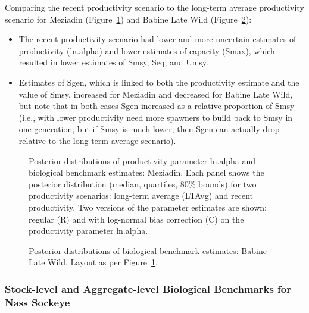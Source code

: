 \documentclass[french,11pt]{book}
\begin{document}
Comparing the recent productivity scenario to the long-term average productivity scenario for Meziadin (Figure~\ref{fig:BMMezidian}) and Babine Late Wild (Figure~\ref{fig:BMBabLW}):
\begin{itemize}

\item
  The recent productivity scenario had lower and more uncertain estimates of productivity (ln.alpha) and lower estimates of capacity (Smax), which resulted in lower estimates of Smsy, Seq, and Umsy.
\item
  Estimates of Sgen, which is linked to both the productivity estimate and the value of Smsy, increased for Meziadin and decreased for Babine Late Wild, but note that in both cases Sgen increased as a relative proportion of Smsy (i.e., with lower productivity need more spawners to build back to Smsy in one generation, but if Smsy is much lower, then Sgen can actually drop relative to the long-term average scenario).
\end{itemize}

\begin{figure}[htb]

{\centering {} 

}

\caption{Posterior distributions of productivity parameter ln.alpha and biological benchmark estimates: Meziadin. Each panel shows the posterior distribution (median, quartiles, 80\% bounds) for two productivity scenarios: long-term average (LTAvg) and recent productivity. Two versions of the parameter estimates are shown: regular (R) and with log-normal bias correction (C) on the productivity parameter ln.alpha.}\label{fig:BMMezidian}
\end{figure}
\clearpage


\begin{figure}[htb]

{\centering {} 

}

\caption{Posterior distributions of biological benchmark estimates: Babine Late Wild. Layout as per Figure~\ref{fig:BMMezidian}.}\label{fig:BMBabLW}
\end{figure}
\clearpage

\subsubsection{Stock-level and Aggregate-level Biological Benchmarks for Nass Sockeye}\label{stock-level-and-aggregate-level-biological-benchmarks-for-nass-sockeye}
\end{document}
